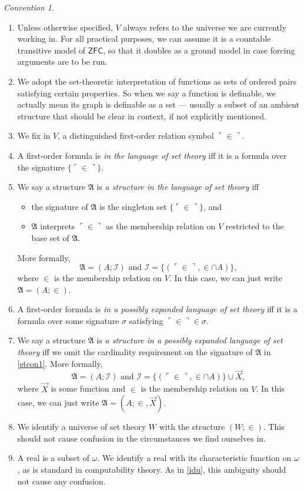 \documentclass[12pt, twoside]{memoir}
\numberwithin{equation}{section}
\theoremstyle{definition}
\theoremstyle{remark}
\newtheorem{con}[thm]{Convention}
\theoremstyle{definition}
\theoremstyle{definition}
\theoremstyle{definition}
\theoremstyle{remark}
\begin{document}
\begin{con}
\leavevmode
\begin{enumerate}[label=(\arabic*)]
    \item Unless otherwise specified, $V$ always refers to the universe we are currently working in. For all practical purposes, we can assume it is a countable transitive model of $\mathsf{ZFC}$, so that it doubles as a ground model in case forcing arguments are to be run.
    \item We adopt the set-theoretic interpretation of functions as sets of ordered pairs satisfying certain properties. So when we say a function is definable, we actually mean its graph is definable as a set --- usually a subset of an ambient structure that should be clear in context, if not explicitly mentioned.
    \item We fix in $V$, a distinguished first-order relation symbol $\ulcorner \in \urcorner$.
    \item A first-order formula is \emph{in the language of set theory} iff it is a formula over the signature $\{\ulcorner \in \urcorner\}$.
    \item\label{stcon1} We say a structure $\mathfrak{A}$ is \emph{a structure in the language of set theory} iff 
    \begin{itemize}
        \item the signature of $\mathfrak{A}$ is the singleton set $\{\ulcorner \in \urcorner\}$, and
        \item $\mathfrak{A}$ interprets $\ulcorner \in \urcorner$ as the membership relation on $V$ restricted to the base set of $\mathfrak{A}$.
    \end{itemize}
    More formally, $$\mathfrak{A} = (A; \mathcal{I}) \text{ and } \mathcal{I} = \{(\ulcorner \in \urcorner, \in \cap A)\},$$ where $\in$ is the membership relation on $V$. In this case, we can just write $\mathfrak{A} = (A; \in)$.
    \item A first-order formula is \emph{in a possibly expanded language of set theory} iff it is a formula over some signature $\sigma$ satisfying $\ulcorner \in \urcorner \in \sigma$.
    \item We say a structure $\mathfrak{A}$ is \emph{a structure in a possibly expanded language of set theory} iff we omit the cardinality requirement on the signature of $\mathfrak{A}$ in \ref{stcon1}. More formally, $$\mathfrak{A} = (A; \mathcal{I}) \text{ and } \mathcal{I} = \{(\ulcorner \in \urcorner, \in \cap A)\} \cup \Vec{X},$$ where $\Vec{X}$ is some function and $\in$ is the membership relation on $V$. In this case, we can just write $\mathfrak{A} = (A; \in, \Vec{X})$.
    \item\label{idu} We identify a universe of set theory $W$ with the structure $(W; \in)$. This should not cause confusion in the circumstances we find ourselves in.
    \item A real is a subset of $\omega$. We identify a real with its characteristic function on $\omega$, as is standard in computability theory. As in \ref{idu}, this ambiguity should not cause any confusion.
\end{enumerate}
\end{con}
\end{document}
